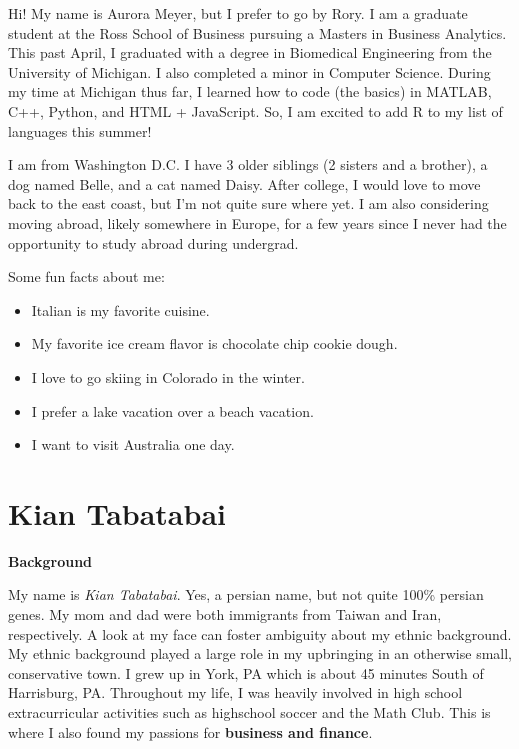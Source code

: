 \documentclass[
]{book}
\providecommand{\tightlist}{%
  \setlength{\itemsep}{0pt}\setlength{\parskip}{0pt}}
\begin{document}
Hi! My name is Aurora Meyer, but I prefer to go by Rory. I am a graduate student at the Ross School of Business pursuing a Masters in Business Analytics. This past April, I graduated with a degree in Biomedical Engineering from the University of Michigan. I also completed a minor in Computer Science. During my time at Michigan thus far, I learned how to code (the basics) in MATLAB, C++, Python, and HTML + JavaScript. So, I am excited to add R to my list of languages this summer!

I am from Washington D.C. I have 3 older siblings (2 sisters and a brother), a dog named Belle, and a cat named Daisy. After college, I would love to move back to the east coast, but I'm not quite sure where yet. I am also considering moving abroad, likely somewhere in Europe, for a few years since I never had the opportunity to study abroad during undergrad.

Some fun facts about me:

\begin{itemize}
\tightlist
\item
  Italian is my favorite cuisine.
\item
  My favorite ice cream flavor is chocolate chip cookie dough.
\item
  I love to go skiing in Colorado in the winter.
\item
  I prefer a lake vacation over a beach vacation.
\item
  I want to visit Australia one day.
\end{itemize}

\hypertarget{kian-tabatabai}{%
\section{Kian Tabatabai}\label{kian-tabatabai}}

\textbf{Background}

My name is \emph{Kian Tabatabai}. Yes, a persian name, but not quite 100\% persian genes. My mom and dad were both immigrants from Taiwan and Iran, respectively. A look at my face can foster ambiguity about my ethnic background. My ethnic background played a large role in my upbringing in an otherwise small, conservative town. I grew up in York, PA which is about 45 minutes South of Harrisburg, PA. Throughout my life, I was heavily involved in high school extracurricular activities such as highschool soccer and the Math Club. This is where I also found my passions for \textbf{business and finance}.
\end{document}
